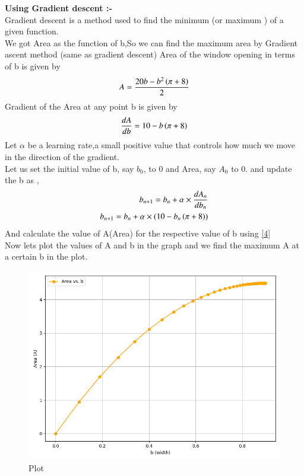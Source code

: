 \documentclass[journal]{IEEEtran}
\begin{document}
\textbf{Using Gradient descent :-} \\
Gradient descent is a method used to find the minimum (or maximum ) of a given function. \\
We got Area as the function of b,So we can find the maximum area by Gradient ascent method (same as gradient descent) 
Area of the window opening in terms of b is given by 
\begin{align}
A = \frac{20b - b^2 \left(\pi +8\right)}{2} 
\end{align} 
Gradient of the Area at any point b is given by 
\begin{align}
\frac{dA}{db} = 10 - b \left(\pi +8\right)
\end{align}
Let $\alpha$ be a learning rate,a small positive value that controls how much we move in the direction of the gradient. \\
Let us set the initial value of b, say $b_0$, to 0 and Area, say $A_0$ to 0. and update the b as ,
\begin{align}
b_{n+1} = b_n +\alpha \times \frac{dA_n}{db_n} \\
b_{n+1} = b_n +\alpha \times (10 - b_n \left(\pi +8\right))
\end{align}
And calculate the value of A(Area) for the respective value of b using \eqref{4} \\
Now lets plot the values of A and b in the graph and we find the maximum A at a certain b in the plot.



\begin{figure}[htbp] %
    \centering
    \includegraphics[width=\textwidth]{figs/plot.png} %
    \caption{Plot}
\end{figure}
\end{document}
